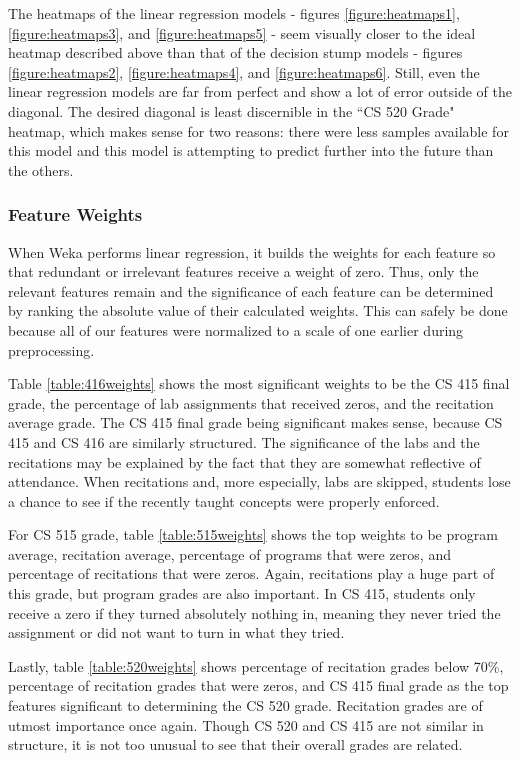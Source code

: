 \documentclass[letterpaper,11pt]{article}
\begin{document}
The heatmaps of the linear regression models - figures \ref{figure:heatmaps1}, \ref{figure:heatmaps3}, and \ref{figure:heatmaps5} -  seem visually closer to the ideal heatmap described above than that of the decision stump models - figures \ref{figure:heatmaps2}, \ref{figure:heatmaps4}, and \ref{figure:heatmaps6}.  Still, even the linear regression models are far from perfect and show a lot of error outside of the diagonal.  The desired diagonal is least discernible in the ``CS 520 Grade" heatmap, which makes sense for two reasons: there were less samples available for this model and this model is attempting to predict further into the future than the others.

\subsubsection{Feature Weights}

When Weka performs linear regression, it builds the weights for each feature so that redundant or irrelevant features receive a weight of zero.  Thus, only the relevant features remain and the significance of each feature can be determined by ranking the absolute value of their calculated weights.  This can safely be done because all of our features were normalized to a scale of one earlier during preprocessing.

Table \ref{table:416weights} shows the most significant weights to be the CS 415 final grade, the percentage of lab assignments that received zeros, and the recitation average grade.  The CS 415 final grade being significant makes sense, because CS 415 and CS 416 are similarly structured.  The significance of the labs and the recitations may be explained by the fact that they are somewhat reflective of attendance.   When recitations and, more especially, labs are skipped, students lose a chance to see if the recently taught concepts were properly enforced.

For CS 515 grade, table \ref{table:515weights} shows the top weights to be program average, recitation average, percentage of programs that were zeros, and percentage of recitations that were zeros.  Again, recitations play a huge part of this grade, but program grades are also important.  In CS 415, students only receive a zero if they turned absolutely nothing in, meaning they never tried the assignment or did not want to turn in what they tried.  

Lastly, table \ref{table:520weights} shows percentage of recitation grades below 70\%, percentage of recitation grades that were zeros, and CS 415 final grade as the top features significant to determining the CS 520 grade.  Recitation grades are of utmost importance once again.  Though CS 520 and CS 415 are not similar in structure, it is not too unusual to see that their overall grades are related.
\end{document}
